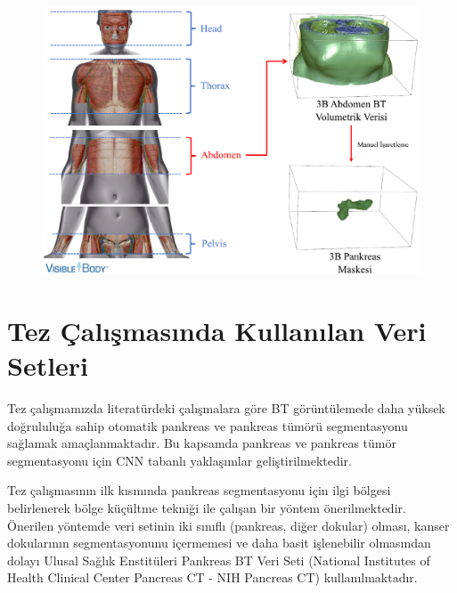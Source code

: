 \begin{figure}[h!]
	\begin{center}
		\vspace{0.4cm}
		{
			\vspace{0.4cm}
			\includegraphics[scale=0.5]{Genel-Bilgiler/Figures/pancreas_abdomen.pdf}
		}
	\end{center}
\end{figure}

\section{Tez Çalışmasında Kullanılan Veri Setleri}
Tez çalışmamızda literatürdeki çalışmalara göre BT görüntülemede daha yüksek doğrululuğa sahip otomatik pankreas ve pankreas tümörü segmentasyonu sağlamak amaçlanmaktadır. Bu kapsamda pankreas ve pankreas tümör segmentasyonu için CNN tabanlı yaklaşımlar geliştirilmektedir. 

Tez çalışmasının ilk kısmında pankreas segmentasyonu için ilgi bölgesi belirlenerek bölge küçültme tekniği ile çalışan bir yöntem önerilmektedir. Önerilen yöntemde veri setinin iki sınıflı (pankreas, diğer dokular) olması, kanser dokularının segmentasyonunu içermemesi ve daha basit işlenebilir olmasından dolayı Ulusal Sağlık Enstitüleri Pankreas BT Veri Seti (National Institutes of Health Clinical Center Pancreas CT - NIH Pancreas CT) kullanılmaktadır.

